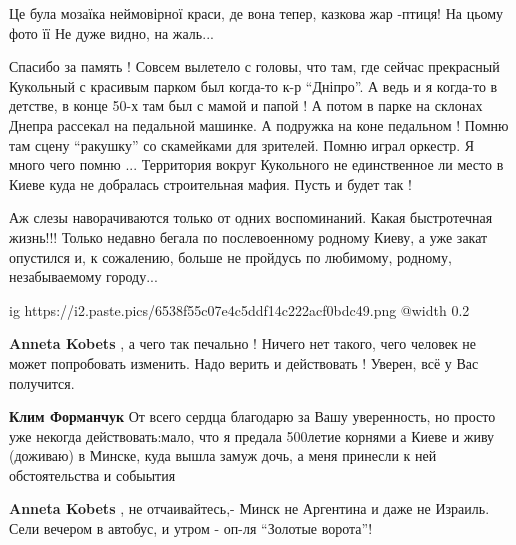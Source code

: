 \begin{itemize}
\begin{itemize}
\begin{itemize}
\end{itemize} %


\end{itemize} %


Це була мозаїка неймовірної краси, де вона тепер, казкова жар -птиця! На цьому
фото її Не дуже видно, на жаль...


Спасибо за память ! Совсем вылетело с головы, что там, где сейчас прекрасный
Кукольный с красивым парком был когда-то к-р \enquote{Дніпро}. А ведь и я когда-то в
детстве, в конце 50-х там был с мамой и папой ! А потом в парке на склонах
Днепра рассекал на педальной машинке. А подружка на коне педальном ! Помню там
сцену \enquote{ракушку} со скамейками для зрителей. Помню играл оркестр. Я много чего
помню ... Территория вокруг Кукольного не единственное ли место в Киеве куда не
добралась строительная мафия. Пусть и будет так !



Аж слезы наворачиваются только от одних воспоминаний. Какая быстротечная
жизнь!!! Только недавно бегала по послевоенному родному Киеву, а уже закат
опустился и, к сожалению, больше не пройдусь по любимому, родному,
незабываемому городу...

\ifcmt
  ig https://i2.paste.pics/6538f55c07e4c5ddf14c222acf0bdc49.png
  @width 0.2
\fi

\begin{itemize} %
\textbf{Anneta Kobets} , а чего так печально ! Ничего нет такого, чего человек не может попробовать изменить. Надо верить и действовать ! Уверен, всё у Вас получится.

\begin{itemize} %
\textbf{Клим Форманчук} От всего сердца благодарю за Вашу уверенность, но просто уже некогда действовать:мало, что я предала 500летие корнями а Киеве и живу (доживаю) в Минске, куда вышла замуж дочь, а меня принесли к ней обстоятельства и собыытия

\textbf{Anneta Kobets} , не отчаивайтесь,- Минск не Аргентина и даже не Израиль. Сели вечером в автобус, и утром - оп-ля \enquote{Золотые ворота}!
\end{itemize} %

\end{itemize} %



\end{itemize}
